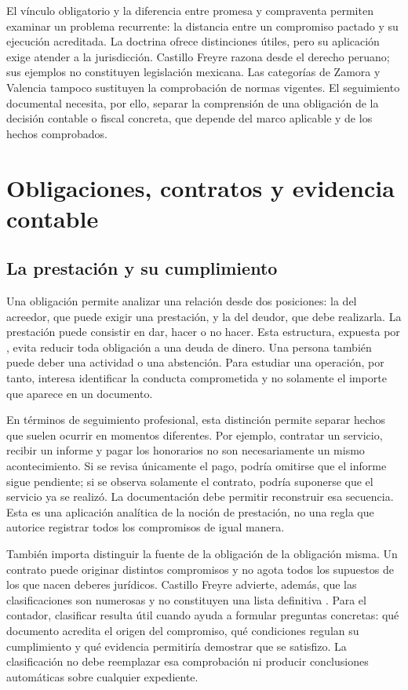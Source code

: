 {El vínculo obligatorio y la diferencia entre promesa y compraventa permiten examinar un problema recurrente: la distancia entre un compromiso pactado y su ejecución acreditada. La doctrina ofrece distinciones útiles, pero su aplicación exige atender a la jurisdicción. Castillo Freyre razona desde el derecho peruano; sus ejemplos no constituyen legislación mexicana. Las categorías de Zamora y Valencia tampoco sustituyen la comprobación de normas vigentes. El seguimiento documental necesita, por ello, separar la comprensión de una obligación de la decisión contable o fiscal concreta, que depende del marco aplicable y de los hechos comprobados.

\clearpage
\section*{Obligaciones, contratos y evidencia contable}
\subsection*{La prestación y su cumplimiento}

Una obligación permite analizar una relación desde dos posiciones: la del acreedor, que puede exigir una prestación, y la del deudor, que debe realizarla. La prestación puede consistir en dar, hacer o no hacer. Esta estructura, expuesta por \textcite[210--211]{castillo2014}, evita reducir toda obligación a una deuda de dinero. Una persona también puede deber una actividad o una abstención. Para estudiar una operación, por tanto, interesa identificar la conducta comprometida y no solamente el importe que aparece en un documento.

En términos de seguimiento profesional, esta distinción permite separar hechos que suelen ocurrir en momentos diferentes. Por ejemplo, contratar un servicio, recibir un informe y pagar los honorarios no son necesariamente un mismo acontecimiento. Si se revisa únicamente el pago, podría omitirse que el informe sigue pendiente; si se observa solamente el contrato, podría suponerse que el servicio ya se realizó. La documentación debe permitir reconstruir esa secuencia. Esta es una aplicación analítica de la noción de prestación, no una regla que autorice registrar todos los compromisos de igual manera.

También importa distinguir la fuente de la obligación de la obligación misma. Un contrato puede originar distintos compromisos y no agota todos los supuestos de los que nacen deberes jurídicos. Castillo Freyre advierte, además, que las clasificaciones son numerosas y no constituyen una lista definitiva \parencite[211]{castillo2014}. Para el contador, clasificar resulta útil cuando ayuda a formular preguntas concretas: qué documento acredita el origen del compromiso, qué condiciones regulan su cumplimiento y qué evidencia permitiría demostrar que se satisfizo. La clasificación no debe reemplazar esa comprobación ni producir conclusiones automáticas sobre cualquier expediente.

}
